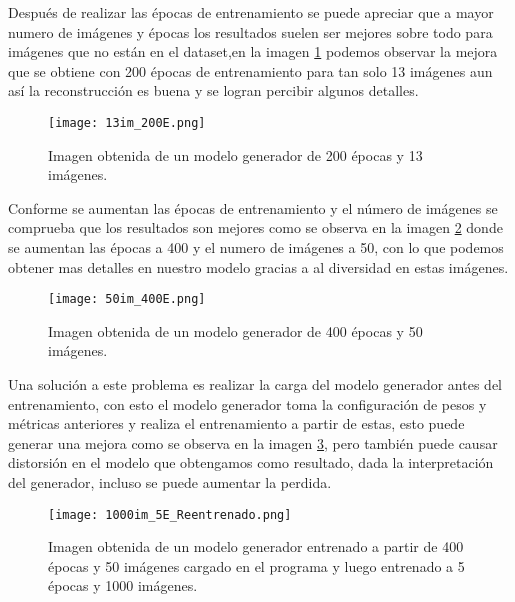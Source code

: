Después de realizar las épocas de entrenamiento se puede apreciar que a mayor numero de imágenes y 
épocas los resultados suelen ser mejores sobre todo para imágenes que no están en el dataset,en la imagen
\ref{Alexis7} podemos observar la mejora que se obtiene con 200 épocas de entrenamiento para tan solo 13 imágenes 
aun así la reconstrucción es buena y se logran percibir algunos detalles.

\begin{figure}[H]
  \begin{center}
    \texttt{[image: 13im\_200E.png]}
    \caption{Imagen obtenida de un modelo generador de 200 épocas y 13 imágenes.}
    \label{Alexis7}
  \end{center}
\end{figure}

Conforme se aumentan las épocas de entrenamiento y el número de imágenes se comprueba
que los resultados son mejores como se observa en la imagen \ref{Alexis8} donde se aumentan
las épocas a 400 y el numero de imágenes a 50, con lo que podemos obtener mas detalles en nuestro modelo
gracias a al diversidad en estas imágenes.

\begin{figure}[H]
  \begin{center}
    \texttt{[image: 50im\_400E.png]}
    \caption{Imagen obtenida de un modelo generador de 400 épocas y 50 imágenes.}
    \label{Alexis8}
  \end{center}
\end{figure}

Una solución a este problema es realizar la carga del modelo generador antes del entrenamiento,
con esto el modelo generador toma la configuración de pesos y métricas anteriores y realiza el entrenamiento
a partir de estas, esto puede generar una mejora como se observa en la imagen \ref{Alexis9}, pero
también puede causar distorsión en el modelo que obtengamos como resultado, dada la interpretación del generador,
incluso se puede aumentar la perdida.

\begin{figure}[H]
  \begin{center}
    \texttt{[image: 1000im\_5E\_Reentrenado.png]}
    \caption{Imagen obtenida de un modelo generador entrenado a partir de 400 épocas y 50 imágenes cargado
    en el programa y luego entrenado a 5 épocas y 1000 imágenes.}
    \label{Alexis9}
  \end{center}
\end{figure}




